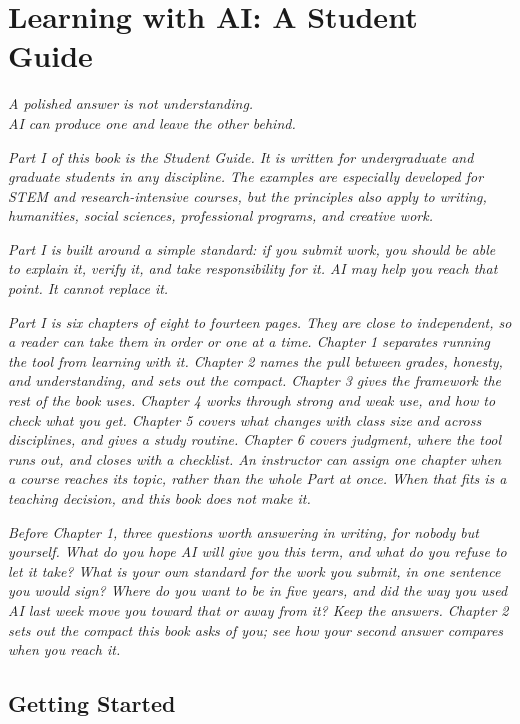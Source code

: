 \documentclass{SIAMbook2023}
\newcommand{\bookepigraph}[1]{%
  \begin{center}%
    \begin{minipage}{0.78\textwidth}%
      \centering\itshape #1%
    \end{minipage}%
  \end{center}%
  \vspace{0.6em}%
}
\begin{document}
\part{Learning with AI: A Student Guide}
\label{part:student}

\bookepigraph{A polished answer is not understanding.\\AI can produce one and leave the other behind.}

\textit{Part I of this book is the Student Guide. It is written for undergraduate and graduate students in any discipline. The examples are especially developed for STEM and research-intensive courses, but the principles also apply to writing, humanities, social sciences, professional programs, and creative work.}

\textit{Part I is built around a simple standard: if you submit work, you should be able to explain it, verify it, and take responsibility for it. AI may help you reach that point. It cannot replace it.}

\textit{Part I is six chapters of eight to fourteen pages. They are close to independent, so a reader can take them in order or one at a time. Chapter 1 separates running the tool from learning with it. Chapter 2 names the pull between grades, honesty, and understanding, and sets out the compact. Chapter 3 gives the framework the rest of the book uses. Chapter 4 works through strong and weak use, and how to check what you get. Chapter 5 covers what changes with class size and across disciplines, and gives a study routine. Chapter 6 covers judgment, where the tool runs out, and closes with a checklist. An instructor can assign one chapter when a course reaches its topic, rather than the whole Part at once. When that fits is a teaching decision, and this book does not make it.}

\textit{Before Chapter 1, three questions worth answering in writing, for nobody but yourself. What do you hope AI will give you this term, and what do you refuse to let it take? What is your own standard for the work you submit, in one sentence you would sign? Where do you want to be in five years, and did the way you used AI last week move you toward that or away from it? Keep the answers. Chapter 2 sets out the compact this book asks of you; see how your second answer compares when you reach it.}

\chapter{Getting Started}
\label{ch:getting-started}%
\end{document}
